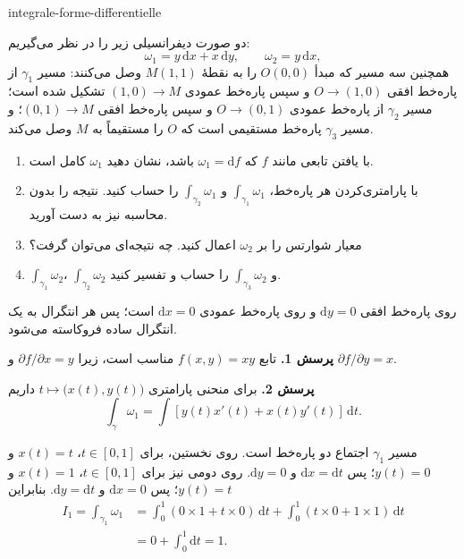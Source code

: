 
\begin{exo}{integrale-forme-differentielle}

دو صورت دیفرانسیلی زیر را در نظر می‌گیریم:
\[
\omega_1 = y\,\mathrm{d}x + x\,\mathrm{d}y,
\qquad
\omega_2 = y\,\mathrm{d}x,
\]
همچنین سه مسیر که مبدأ $O(0,0)$ را به نقطهٔ $M(1,1)$ وصل می‌کنند:
مسیر $\gamma_1$ از پاره‌خط افقی $O\to(1,0)$ و سپس پاره‌خط عمودی
$(1,0)\to M$ تشکیل شده است؛ مسیر $\gamma_2$ از پاره‌خط عمودی $O\to(0,1)$
و سپس پاره‌خط افقی $(0,1)\to M$؛ و مسیر $\gamma_3$ پاره‌خط مستقیمی است که
$O$ را مستقیماً به $M$ وصل می‌کند.

\begin{enumerate}
\item با یافتن تابعی مانند $f$ که $\omega_1=\mathrm{d}f$ باشد، نشان دهید $\omega_1$ کامل است.
\item با پارامتری‌کردن هر پاره‌خط، $\int_{\gamma_1}\omega_1$ و $\int_{\gamma_2}\omega_1$ را حساب کنید. نتیجه را بدون محاسبه نیز به دست آورید.
\item معیار شوارتس را بر $\omega_2$ اعمال کنید. چه نتیجه‌ای می‌توان گرفت؟
\item $\int_{\gamma_1}\omega_2$، $\int_{\gamma_2}\omega_2$ و $\int_{\gamma_3}\omega_2$ را حساب و تفسیر کنید.
\end{enumerate}

\begin{indication}
روی پاره‌خط افقی $\mathrm{d}y=0$ و روی پاره‌خط عمودی $\mathrm{d}x=0$ است؛
پس هر انتگرال به یک انتگرال ساده فروکاسته می‌شود.
\end{indication}

\begin{solution}
\textbf{پرسش 1.} تابع $f(x,y)=xy$ مناسب است، زیرا $\partial f/\partial x=y$ و $\partial f/\partial y=x$.

\textbf{پرسش 2.} برای منحنی پارامتری
$t\mapsto\bigl(x(t),y(t)\bigr)$ داریم
\[
\int_\gamma\omega_1
= \int \left[y(t)x'(t)+x(t)y'(t)\right]\,\mathrm{d}t.
\]

مسیر $\gamma_1$ اجتماع دو پاره‌خط است. روی نخستین، برای $t\in[0,1]$،
$x(t)=t$ و $y(t)=0$؛ پس $\mathrm{d}x=\mathrm{d}t$ و $\mathrm{d}y=0$.
روی دومی نیز برای $t\in[0,1]$، $x(t)=1$ و $y(t)=t$؛ پس
$\mathrm{d}x=0$ و $\mathrm{d}y=\mathrm{d}t$. بنابراین
\[
\begin{aligned}
I_1
= \int_{\gamma_1}\omega_1
&= \int_0^1\left(0\times 1+t\times 0\right)\,\mathrm{d}t
 + \int_0^1\left(t\times 0+1\times 1\right)\,\mathrm{d}t \\
&= 0+\int_0^1\mathrm{d}t = 1.
\end{aligned}
\]


\end{solution}
\end{exo}
